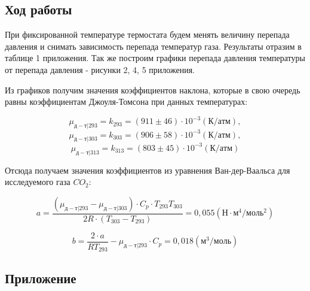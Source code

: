 \documentclass[a4paper, fontsize = 14pt]{article}
\begin{document}
\subsection*{Ход работы}

При фиксированной температуре термостата будем менять величину перепада давления и снимать зависимость перепада температур газа. Результаты отразим в таблице 1 приложения. Так же построим графики перепада давления температуры от перепада давления - рисунки 2, 4, 5 приложения.

Из графиков получим значения коэффициентов наклона, которые в свою очередь равны коэффициентам Джоуля-Томсона при данных температурах:

\[\mu_{д-т|293}=k_{293} = (911\pm46)\cdot 10^{-3} (К/атм),\] \[ \mu_{д-т|303}
=k_{303} = (906\pm58)\cdot 10^{-3} (К/атм),\] \[ \mu_{д-т|313}=k_{313} = (803\pm45)\cdot 10^{-3} (К/атм)\] 

Отсюда получаем значения коэффициентов из уравнения Ван-дер-Ваальса для исследуемого газа $CO_2$:

\[ a = \frac{(\mu_{д-т|293} - \mu_{д-т|303})\cdot C_p \cdot T_{293} T_{303}}{2R\cdot(T_{303}-T_{293})}=0,055(Н\cdot м^4/ моль^2) \]

\[ b = \frac{2\cdot a}{RT_{293}} - \mu_{д-т|293}\cdot C_p = 0,018(м^3/моль) \]

\newpage

\subsection*{Приложение}
\end{document}
